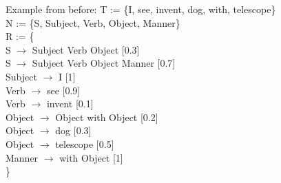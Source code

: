 \documentclass[t,usenames,dvipsnames]{beamer} %
\newcommand{\1}{\boldsymbol{1}}
\newcommand{\0}{\boldsymbol{0}}
\begin{document}



\begin{frame}
\begin{block}{Example from before:} 
T := \{I, see, invent, dog, with, telescope\} \\
N := \{S, Subject, Verb, Object, Manner\} \\
R := \{ \\
    S $\to$ Subject Verb Object [0.3]  \\
    S $\to$ Subject Verb Object Manner [0.7] \\
    Subject $\to$ I [1] \\
    Verb $\to$ see [0.9] \\
    Verb $\to$ invent [0.1] \\
    Object $\to$ Object with Object [0.2] \\
    Object $\to$ dog [0.3] \\
    Object $\to$ telescope [0.5] \\
    Manner $\to$ with Object [1] \\
\}
\end{block}
\end{frame}
\end{document}
